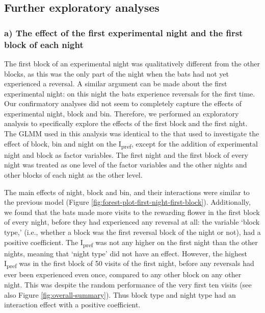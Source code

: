 \documentclass[
]{article}
\begin{document}
\hypertarget{further-exploratory-analyses}{%
\subsection{Further exploratory analyses}\label{further-exploratory-analyses}}

\hypertarget{a-the-effect-of-the-first-experimental-night-and-the-first-block-of-each-night}{%
\subsubsection{a) The effect of the first experimental night and the first block of each night}\label{a-the-effect-of-the-first-experimental-night-and-the-first-block-of-each-night}}

The first block of an experimental night was qualitatively different from the other blocks, as this was the only part of the night when the bats had not yet experienced a reversal. A similar argument can be made about the first experimental night: on this night the bats experience reversals for the first time. Our confirmatory analyses did not seem to completely capture the effects of experimental night, block and bin. Therefore, we performed an exploratory analysis to specifically explore the effects of the first block and the first night. The GLMM used in this analysis was identical to the that used to investigate the effect of block, bin and night on the I\textsubscript{pref}, except for the addition of experimental night and block as factor variables. The first night and the first block of every night was treated as one level of the factor variables and the other nights and other blocks of each night as the other level.

The main effects of night, block and bin, and their interactions were similar to the previous model (Figure \ref{fig:forest-plot-first-night-first-block}). Additionally, we found that the bats made more visits to the rewarding flower in the first block of every night, before they had experienced any reversal at all: the variable `block type,' (i.e., whether a block was the first reversal block of the night or not), had a positive coefficient. The I\textsubscript{pref} was not any higher on the first night than the other nights, meaning that `night type' did not have an effect. However, the highest I\textsubscript{pref} was in the first block of 50 visits of the first night, before any reversals had ever been experienced even once, compared to any other block on any other night. This was despite the random performance of the very first ten visits (see also Figure \ref{fig:overall-summary}). Thus block type and night type had an interaction effect with a positive coefficient.
\end{document}
